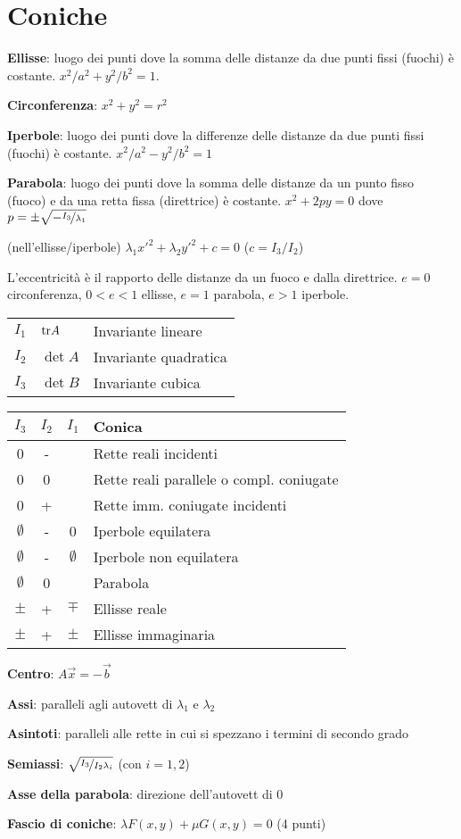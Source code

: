 \section{Coniche}

\textbf{Ellisse}: luogo dei punti dove la somma delle distanze da due punti fissi (fuochi) è costante. $x^2/a^2 + y^2/b^2 = 1$.

\textbf{Circonferenza}: $x^2+y^2=r^2$

\textbf{Iperbole}: luogo dei punti dove la differenze delle distanze da due punti fissi (fuochi) è costante. $x^2/a^2 - y^2/b^2 = 1$

\textbf{Parabola}: luogo dei punti dove la somma delle distanze da un punto fisso (fuoco) e da una retta fissa (direttrice) è costante. $x^2+2py=0$ dove $p=\pm \sqrt{-\nicefrac{I_3}{\lambda_1}}$

(nell'ellisse/iperbole) $\lambda_1x'^2+\lambda_2y'^2+c=0$ ($c=I_3/I_2$)

L'eccentricità è il rapporto delle distanze da un fuoco e dalla direttrice. $e = 0$ circonferenza, $0 < e < 1$ ellisse, $e = 1$ parabola, $e > 1$ iperbole. 

\begin{tabular}{lll}
	$I_1$ & $\mathrm{tr} A$ & Invariante lineare \\
	$I_2$ & $\det A$ & Invariante quadratica \\
	$I_3$ & $\det B$ & Invariante cubica
\end{tabular}

\begin{tabular}{c|c|c|l}
	\boldmath$I_3$ & \boldmath$I_2$ & \boldmath$I_1$ & \textbf{Conica} \\
	\hline
	0     & -     &       & Rette reali incidenti \\
	0     & 0     &       & Rette reali parallele o compl. coniugate \\
	0     & +     &       & Rette imm. coniugate incidenti \\
	\hline
	$\emptyset$ & -     & 0     & Iperbole equilatera \\
	$\emptyset$ & -     & $\emptyset$ & Iperbole non equilatera \\
	$\emptyset$ & 0     &       & Parabola \\
	$\pm$ & +     & $\mp$ & Ellisse reale \\
	$\pm$ & +     & $\pm$ & Ellisse immaginaria \\
	\hline
\end{tabular}

\textbf{Centro}: $A\vec{x} = -\vec{b}$

\textbf{Assi}: paralleli agli autovett di $\lambda_1$ e $\lambda_2$

\textbf{Asintoti}: paralleli alle rette in cui si spezzano i termini di secondo grado

\textbf{Semiassi}: $\sqrt{\nicefrac{I_3}{I_2\lambda_i}}$ (con $i=1,2$)

\textbf{Asse della parabola}: direzione dell'autovett di 0

\textbf{Fascio di coniche}: $\lambda F(x,y) + \mu G(x,y) = 0$ (4 punti)

